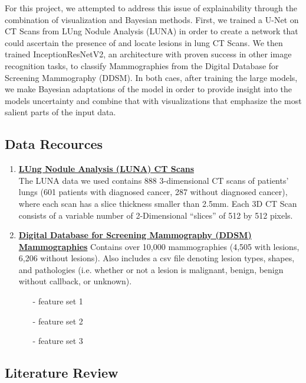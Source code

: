 \documentclass[12pt]{article}
\begin{document}
{For this project, we attempted to address this issue of explainability through the combination of visualization and Bayesian methods. First, we trained a U-Net on CT Scans from LUng Nodule Analysis (LUNA) in order to create a network that could ascertain the presence of and locate lesions in lung CT Scans. We then trained InceptionResNetV2, an architecture with proven success in other image recognition tasks, to classify Mammographies from the Digital Database for Screening Mammography (DDSM). In both caes, after training the large models, we make Bayesian adaptations of the model in order to provide insight into the models uncertainty and combine that with visualizations that emphasize the most salient parts of the input data.

\subsection*{Data Recources}

\begin{enumerate}
\item \textbf{\href{https://wiki.cancerimagingarchive.net/display/Public/LIDC-IDRI}{LUng Nodule Analysis (LUNA) CT Scans}}\\
The LUNA data we used contains 888 3-dimensional CT scans of patients' lungs (601 patients with diagnosed cancer, 287 without diagnosed cancer), where each scan has a slice thickness smaller than 2.5mm. Each 3D CT Scan consists of a variable number of 2-Dimensional ``slices'' of 512 by 512 pixels. 

\item \textbf{\href{https://www.ncbi.nlm.nih.gov/pmc/articles/PMC3041807}{Digital Database for Screening Mammography (DDSM) Mammographies}}
Contains over 10,000 mammographies (4,505 with lesions, 6,206 without lesions). Also includes a csv file denoting lesion types, shapes, and pathologies (i.e. whether or not a lesion is malignant, benign, benign without callback, or unknown). 

\begin{itemize}
\item[-] feature set 1
\item[-] feature set 2
\item[-] feature set 3
\end{itemize}
\end{enumerate}

\subsection*{Literature Review}

}
\end{document}
